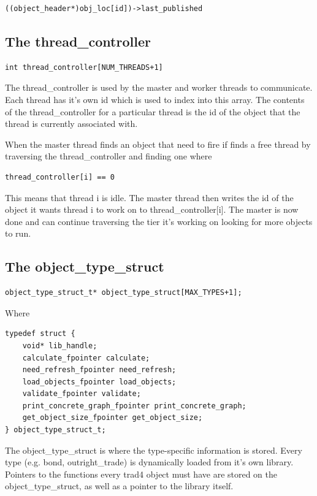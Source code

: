 \documentclass{report}
\begin{document}
\begin{verbatim}
((object_header*)obj_loc[id])->last_published
\end{verbatim}

\subsection{The thread_controller}

\begin{verbatim}
int thread_controller[NUM_THREADS+1]
\end{verbatim}

The thread_controller is used by the master and worker threads to communicate. Each thread has it's own id which is used to index into this array. The contents of the thread_controller for a particular thread is the id of the object that the thread is currently associated with. 

When the master thread finds an object that need to fire if finds a free thread by traversing the thread_controller and finding one where

\begin{verbatim}
thread_controller[i] == 0
\end{verbatim}

This means that thread i is idle. The master thread then writes the id of the object it wants thread i to work on to thread_controller[i]. The master is now done and can continue traversing the tier it's working on looking for more objects to run. 

\subsection{The object_type_struct}

\begin{verbatim}
object_type_struct_t* object_type_struct[MAX_TYPES+1];
\end{verbatim}

Where

\begin{verbatim}
typedef struct {
    void* lib_handle;
    calculate_fpointer calculate;
    need_refresh_fpointer need_refresh;
    load_objects_fpointer load_objects;
    validate_fpointer validate;
    print_concrete_graph_fpointer print_concrete_graph;
    get_object_size_fpointer get_object_size;
} object_type_struct_t;
\end{verbatim}

The object_type_struct is where the type-specific information is stored. Every type (e.g. bond, outright_trade) is dynamically loaded from it's own library. Pointers to the functions every trad4 object must have are stored on the object_type_struct, as well as a pointer to the library itself.  
\end{document}
